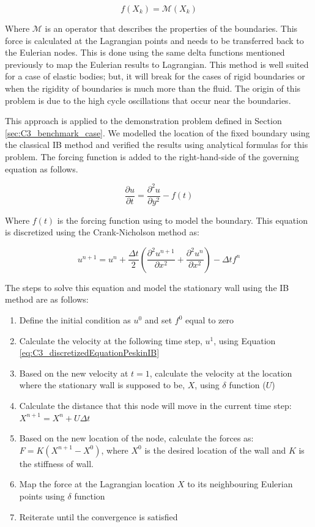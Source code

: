 \begin{equation}
    f(X_k) = \mathcal{M}(X_k)
\end{equation}

Where $\mathcal{M}$ is an operator that describes the properties of the boundaries. This force is calculated at the Lagrangian points and needs to be transferred back to the Eulerian nodes. This is done using the same delta functions mentioned previously to map the Eulerian results to Lagrangian. This method is well suited for a case of elastic bodies; but, it will break for the cases of rigid boundaries or when the rigidity of boundaries is much more than the fluid. The origin of this problem is due to the high cycle oscillations that occur near the boundaries.

This approach is applied to the demonstration problem defined in Section \ref{sec:C3_benchmark_case}. We modelled the location of the fixed boundary using the classical IB method and verified the results using analytical formulas for this problem. The forcing function is added to the right-hand-side of the governing equation as follows.

\begin{equation}
    \frac{\partial u}{\partial t} = \frac{\partial^2 u}{\partial y^2} - f(t)
\end{equation}

Where $f(t)$ is the forcing function using to model the boundary. This equation is discretized using the Crank-Nicholson method as:

\begin{equation}\label{eq:C3_discretizedEquationPeskinIB}
    u^{n+1} = u^{n} + \frac{\Delta t}{2} \left( \frac{\partial^2 u^{n+1}}{\partial x^2} + 
                                                \frac{\partial^2 u^n}{\partial x^2}\right) - \Delta t f^n 
\end{equation}

The steps to solve this equation and model the stationary wall using the IB method are as follows:

\begin{enumerate}
    \item Define the initial condition as $u^0$ and set $f^0$ equal to zero
    \item Calculate the velocity at the following time step, $u^1$, using Equation \eqref{eq:C3_discretizedEquationPeskinIB}
    \item Based on the new velocity at $t=1$, calculate the velocity at the location where the stationary wall is supposed to be, $X$, using $\delta$ function ($U$)
    \item Calculate the distance that this node will move in the current time step: $X^{n+1} = X^n + U \Delta t$
    \item Based on the new location of the node, calculate the forces as: $F = K \left( X^{n+1} - X^0 \right)$, where $X^0$ is the desired location of the wall and $K$ is the stiffness of wall.
    \item Map the force at the Lagrangian location $X$ to its neighbouring Eulerian points using $\delta$ function
    \item Reiterate until the convergence is satisfied
\end{enumerate}

